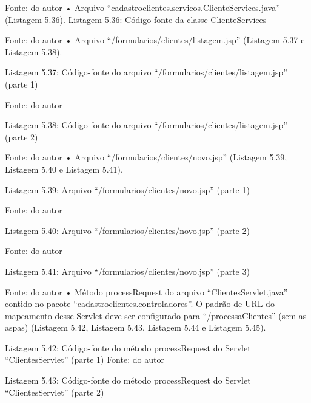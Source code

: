 Fonte: do autor
•	Arquivo “cadastroclientes.servicos.ClienteServices.java” (Listagem 5.36).
Listagem 5.36: Código-fonte da classe ClienteServices
 
Fonte: do autor
•	Arquivo “/formularios/clientes/listagem.jsp” (Listagem 5.37 e Listagem 5.38).



Listagem 5.37: Código-fonte do arquivo “/formularios/clientes/listagem.jsp” (parte 1)
 
Fonte: do autor









Listagem 5.38: Código-fonte do arquivo “/formularios/clientes/listagem.jsp” (parte 2)
 
Fonte: do autor
•	Arquivo “/formularios/clientes/novo.jsp” (Listagem 5.39, Listagem 5.40 e Listagem 5.41).









Listagem 5.39: Arquivo “/formularios/clientes/novo.jsp” (parte 1)
 
Fonte: do autor



Listagem 5.40: Arquivo “/formularios/clientes/novo.jsp” (parte 2)
 
Fonte: do autor



Listagem 5.41: Arquivo “/formularios/clientes/novo.jsp” (parte 3)
 
Fonte: do autor
•	Método processRequest do arquivo “ClientesServlet.java” contido no pacote “cadastroclientes.controladores”. O padrão de URL do mapeamento desse Servlet deve ser configurado para “/processaClientes” (sem as aspas) (Listagem 5.42, Listagem 5.43, Listagem 5.44 e Listagem 5.45).














Listagem 5.42: Código-fonte do método processRequest do Servlet “ClientesServlet” (parte 1)
 Fonte: do autor






Listagem 5.43: Código-fonte do método processRequest do Servlet “ClientesServlet” (parte 2)
 
